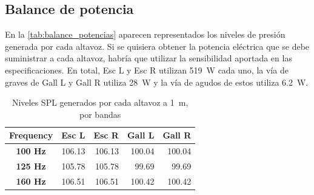 \documentclass{article}
\begin{document}
\subsection{Balance de potencia}

En la \autoref{tab:balance_potencias} aparecen representados los niveles de presión generada por cada altavoz. Si se quisiera obtener la potencia eléctrica que se debe suministrar a cada altavoz, habría que utilizar la sensibilidad aportada en las especificaciones. En total, Esc L y Esc R utilizan \qty{519}{\watt} cada uno, la vía de graves de Gall L y Gall R utiliza \qty{28}{\watt} y la vía de agudos de estos utiliza \qty{6.2}{\watt}.

\begin{table}[htbp]
    \centering
    \caption{Niveles SPL generados por cada altavoz a \qty{1}{\metre }, por bandas}
    \begin{tabular}{|c|r|r|r|r|}
        \hline
        \rowcolor[rgb]{ .439,  .678,  .278} \textcolor[rgb]{ 1,  1,  1}{\textbf{Frequency}} & \multicolumn{1}{c|}{\textcolor[rgb]{ 1,  1,  1}{\textbf{Esc L}}} & \multicolumn{1}{c|}{\textcolor[rgb]{ 1,  1,  1}{\textbf{Esc R}}} & \multicolumn{1}{c|}{\textcolor[rgb]{ 1,  1,  1}{\textbf{Gall L}}} & \multicolumn{1}{c|}{\textcolor[rgb]{ 1,  1,  1}{\textbf{Gall R}}} \bigstrut \\        \hline
        \rowcolor[rgb]{ .439,  .678,  .278} \textcolor[rgb]{ 1,  1,  1}{\textbf{100 Hz }}   & \cellcolor[rgb]{ 1,  1,  1}106.13                                & \cellcolor[rgb]{ .886,  .937,  .855}106.13                       & \cellcolor[rgb]{ 1,  1,  1}100.04                                 & \cellcolor[rgb]{ .886,  .937,  .855}100.04 \bigstrut                        \\        \hline
        \rowcolor[rgb]{ .439,  .678,  .278} \textcolor[rgb]{ 1,  1,  1}{\textbf{125 Hz }}   & \cellcolor[rgb]{ 1,  1,  1}105.78                                & \cellcolor[rgb]{ .886,  .937,  .855}105.78                       & \cellcolor[rgb]{ 1,  1,  1}99.69                                  & \cellcolor[rgb]{ .886,  .937,  .855}99.69 \bigstrut                         \\        \hline
        \rowcolor[rgb]{ .439,  .678,  .278} \textcolor[rgb]{ 1,  1,  1}{\textbf{160 Hz }}   & \cellcolor[rgb]{ 1,  1,  1}106.51                                & \cellcolor[rgb]{ .886,  .937,  .855}106.51                       & \cellcolor[rgb]{ 1,  1,  1}100.42                                 & \cellcolor[rgb]{ .886,  .937,  .855}100.42 \bigstrut                        \\        \hline

\end{tabular}
\end{table}
\end{document}
